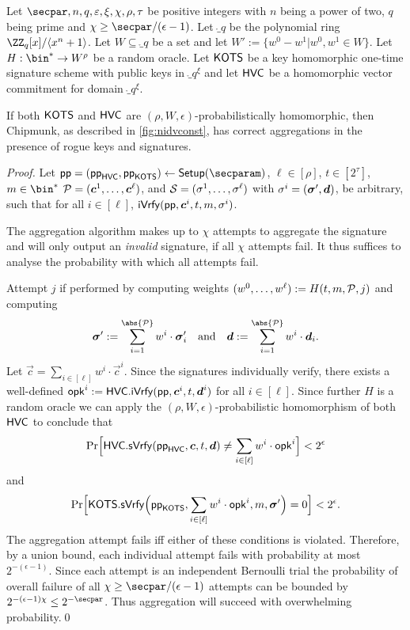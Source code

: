 \begin{lemma}\label{lem:msigaggcorrect}
  Let $\secpar,n,q,\varepsilon,\xi,\chi,\rho,\tau$ be positive integers with $n$ being a power of two, $q$ being prime and $\chi \geq \secpar/(\epsilon-1)$.
Let $\ring_q$ be the polynomial ring $\ZZ_q[x]/\langle x^n+1\rangle$.
Let $W \subseteq \ring_q$ be a set and let $W' := \{w^0-w^1| w^0,w^1 \in W\}$.
Let $H : \bin^* \to W^\rho$ be a random oracle.
Let $\mathsf{KOTS}$ be a key homomorphic one-time signature scheme with public keys in $\ring_q^\xi$ and let $\mathsf{HVC}$ be a homomorphic vector commitment for domain $\ring_q^\xi$.

If both $\mathsf{KOTS}$ and $\mathsf{HVC}$ are $(\rho,W,\epsilon)$-probabilistically homomorphic, then Chipmunk, as described in \autoref{fig:nidvconst}, has correct aggregations in the presence of rogue keys and signatures.
\end{lemma}
\begin{proof}
  Let $\params = (\params_\hvc,\params_\hots)\gets\setup(\secparam)$, $\ell \in [\rho]$, $t\in[2^\tau]$, $m\in\bin^*$ $\mathcal{P} = (\boldsymbol{c}^1,\dots,\boldsymbol{c}^\ell)$, and $\mathcal{S} = (\sigma^1,\dots,\sigma^\ell)$ with $\sigma^i=(\boldsymbol{\sigma}',\boldsymbol{d})$, be arbitrary, such that for all $i\in[\ell]$, $\mathsf{iVrfy}(\mathsf{pp},\boldsymbol{c}^i,t,m,\sigma^i)$.
  
  The aggregation algorithm makes up to $\chi$ attempts to aggregate the signature and will only output an \emph{invalid} signature, if all $\chi$ attempts fail.
  It thus suffices to analyse the probability with which all attempts fail.
  
  Attempt $j$ if performed by computing weights $(w^0,\dots,w^\ell) := H(t,m,\mathcal{P},j)$ and computing 
  \[
    \otsig := \sum_{i=1}^{\abs{\pubkeys}} w^i\cdot \otsig_i \quad \text{and}\quad \vec{d} := \sum_{i=1}^{\abs{\pubkeys}} w^i\cdot \vec{d}_i.
  \]
  Let $\vec{c} = \sum_{i\in[\ell]}w^i\cdot\vec{c}^i$.
  Since the signatures individually verify, there exists a well-defined $\mathsf{opk}^i := \mathsf{HVC}.\mathsf{iVrfy}(\mathsf{pp},\boldsymbol{c}^i,t,\boldsymbol{d}^i)$ for all $i\in[\ell]$.
  Since further $H$ is a random oracle we can apply the $(\rho,W,\epsilon)$-probabilistic homomorphism of both $\mathsf{HVC}$ to conclude that
  \[
    \Pr\Bigl[\mathsf{HVC}.\mathsf{sVrfy}(\mathsf{pp}_{\mathsf{HVC}},\boldsymbol{c},t,\boldsymbol{d}) \neq \sum_{i\in[\ell]} w^i\cdot\mathsf{opk}^i\Bigr] < 2^{\-\epsilon}
  \]
  and
  \[
    \Pr\Bigl[\mathsf{KOTS}.\mathsf{sVrfy}\Bigl(\mathsf{pp}_{\mathsf{KOTS}},\sum_{i\in[\ell]} w^i\cdot\mathsf{opk}^i, m, \boldsymbol{\sigma}'\Bigr) = 0\Bigr] < 2^{\-\epsilon}.
  \]
  The aggregation attempt fails iff either of these conditions is violated.
  Therefore, by a union bound, each individual attempt fails with probability at most $2^{-(\epsilon-1)}$.
  Since each attempt is an independent Bernoulli trial the probability of overall failure of all $\chi\geq \secpar/(\epsilon-1)$ attempts can be bounded by $2^{-(\epsilon-1)\chi} \leq 2^{-\secpar}$.
  Thus aggregation will succeed with overwhelming probability.\qed
\end{proof}

